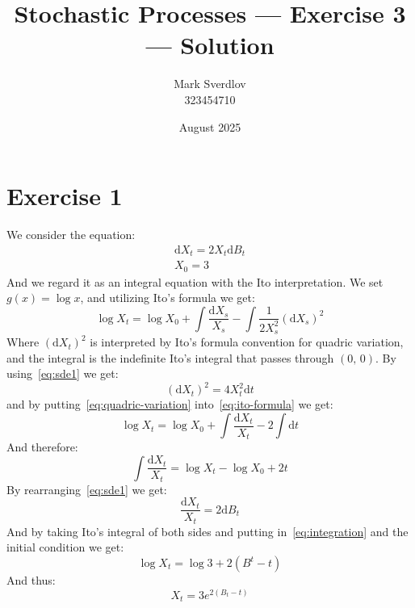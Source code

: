 \documentclass{amsart}
\title{Stochastic Processes --- Exercise 3 --- Solution}
\author{Mark Sverdlov \\ 323454710}
\date{August 2025}
\theoremstyle{plain}
\theoremstyle{definition}
\theoremstyle{definition}
\theoremstyle{remark}
\newcommand{\diff}{\mathrm{d}}
\begin{document}
\maketitle
    \section{Exercise 1}
        We consider the equation:
        \begin{gather}
            \label{eq:sde1}
            \diff X_{t} = 2X_{t}\diff B_{t} \\
            X_{0} = 3
        \end{gather}
        And we regard it as an integral equation with the Ito interpretation. We set \(g \left(x\right) = \log x\), and utilizing Ito's formula we get:
        \begin{equation}
            \label{eq:ito-formula}
            \log X_{t} = \log X_{0} + \int \frac{\diff X_{s}}{X_{s}} - \int \frac{1}{2X_{s}^{2}} \left(\diff X_{s}\right)^{2}
        \end{equation}
        Where \(\left(\diff X_{t}\right)^{2}\) is interpreted by Ito's formula convention for quadric variation, and the integral is the indefinite Ito's integral that passes through \(\left(0,\,0\right)\). By using~\eqref{eq:sde1} we get:
        \begin{equation}
            \label{eq:quadric-variation}
            \left(\diff X_{t}\right)^{2} = 4X_{t}^{2} \diff t
        \end{equation}
        and by putting~\eqref{eq:quadric-variation} into~\eqref{eq:ito-formula} we get:
        \begin{equation*}
           \log X_{t} = \log X_{0} + \int \frac{\diff X_{t}}{X_{t}} -2 \int \diff t
        \end{equation*}
        And therefore:
        \begin{equation}
            \label{eq:integration}
            \int \frac{\diff  X_{t}}{X_{t}} = \log X_{t} - \log X_{0} + 2t
        \end{equation}
        By rearranging~\eqref{eq:sde1} we get:
        \begin{equation*}
            \frac{\diff X_{t}}{X_{t}} = 2 \diff B_{t}
        \end{equation*}
        And by taking Ito's integral of both sides and putting in~\eqref{eq:integration} and the initial condition we get:
        \begin{equation*}
           \log X_{t} = \log 3 + 2 \left(B^{t}-t\right)
        \end{equation*}
        And thus:
        \begin{equation*}
            X_{t} = 3 e^{2\left(B_{t}-t\right)}
        \end{equation*}
\end{document}
